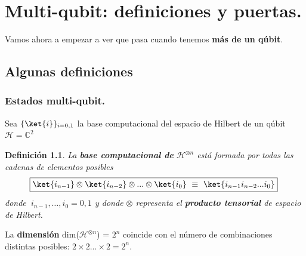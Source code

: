 \documentclass[a4paper,11pt]{book} %
\newtheorem{definicion_contador}{Definición}
\newcommand{\Definicion}[1]{
		\begin{mybox_gray2}{}
			\begin{definicion_contador}
				 #1 
			\end{definicion_contador} 
		\end{mybox_gray2}
	}
\numberwithin{equation}{chapter}
\begin{document}
		
		
		
		
		
		
		
		
		


\chapter{Multi-qubit: definiciones y puertas.}

Vamos ahora a empezar a ver que pasa cuando tenemos \textbf{más de un qúbit}. 

    \section{Algunas definiciones}
    
		\subsection{Estados multi-qubit.}

 Sea $\{ \ket{i}\}_{i=0,1}$ la base computacional del espacio de Hilbert de un qúbit $\mathcal{H} = {\mathbb C}^2$
 
	\Definicion{
	La \textbf{base computacional de} $ \mathcal{H}^{\otimes n}$ está formada por todas las cadenas de elementos posibles
	\begin{equation}
	\boxed{\ket{i_{n-1}}\otimes \ket{i_{n-2}}\otimes ... \otimes \ket{i_0} ~\equiv ~\ket{i_{n-1} i_{n-2}...i_0}}~
	\end{equation} 
	donde $~ i_{n-1},\dots,i_0=0,1$ y donde $\otimes$ representa el \textbf{producto tensorial} de espacio de Hilbert.
	}
	
La \textbf{dimensión}  dim($\mathcal{H}^{\otimes n}$) = $2^n$ coincide con el número de combinaciones distintas posibles: 	$2\times 2...\times 2 = 2^n$.    
\end{document}
